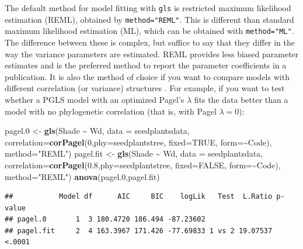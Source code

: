\documentclass[
]{book}
\newenvironment{Shaded}{\begin{snugshade}}{\end{snugshade}}
\newcommand{\AttributeTok}[1]{\textcolor[rgb]{0.13,0.29,0.53}{#1}}
\newcommand{\ConstantTok}[1]{\textcolor[rgb]{0.56,0.35,0.01}{#1}}
\newcommand{\DecValTok}[1]{\textcolor[rgb]{0.00,0.00,0.81}{#1}}
\newcommand{\FloatTok}[1]{\textcolor[rgb]{0.00,0.00,0.81}{#1}}
\newcommand{\FunctionTok}[1]{\textcolor[rgb]{0.13,0.29,0.53}{\textbf{#1}}}
\newcommand{\NormalTok}[1]{#1}
\newcommand{\OtherTok}[1]{\textcolor[rgb]{0.56,0.35,0.01}{#1}}
\newcommand{\SpecialCharTok}[1]{\textcolor[rgb]{0.81,0.36,0.00}{\textbf{#1}}}
\newcommand{\StringTok}[1]{\textcolor[rgb]{0.31,0.60,0.02}{#1}}
\begin{document}
The default method for model fitting with \texttt{gls} is restricted maximum likelihood estimation (REML), obtained by \texttt{method="REML"}. This is different than standard maximum likelihood estimation (ML), which can be obtained with \texttt{method="ML"}. The difference between these is complex, but suffice to say that they differ in the way the variance parameters are estimated. REML provides less biased parameter estimates and is the preferred method to report the parameter coefficients in a publication. It is also the method of choice if you want to compare models with different correlation (or variance) structures \citep{zuur2009mixed}. For example, if you want to test whether a PGLS model with an optimized Pagel's \(\lambda\) fits the data better than a model with no phylogenetic correlation (that is, with Pagel \(\lambda=0\)):

\begin{Shaded}
\begin{Highlighting}[]
\NormalTok{pagel}\FloatTok{.0} \OtherTok{\textless{}{-}} \FunctionTok{gls}\NormalTok{(Shade }\SpecialCharTok{\textasciitilde{}}\NormalTok{ Wd, }\AttributeTok{data =}\NormalTok{ seedplantsdata, }
               \AttributeTok{correlation=}\FunctionTok{corPagel}\NormalTok{(}\DecValTok{0}\NormalTok{,}\AttributeTok{phy=}\NormalTok{seedplantstree, }
                                    \AttributeTok{fixed=}\ConstantTok{TRUE}\NormalTok{, }\AttributeTok{form=}\SpecialCharTok{\textasciitilde{}}\NormalTok{Code), }
               \AttributeTok{method=}\StringTok{"REML"}\NormalTok{)}
\NormalTok{pagel.fit }\OtherTok{\textless{}{-}} \FunctionTok{gls}\NormalTok{(Shade }\SpecialCharTok{\textasciitilde{}}\NormalTok{ Wd, }\AttributeTok{data =}\NormalTok{ seedplantsdata, }
                 \AttributeTok{correlation=}\FunctionTok{corPagel}\NormalTok{(}\FloatTok{0.8}\NormalTok{,}\AttributeTok{phy=}\NormalTok{seedplantstree, }
                                      \AttributeTok{fixed=}\ConstantTok{FALSE}\NormalTok{, }\AttributeTok{form=}\SpecialCharTok{\textasciitilde{}}\NormalTok{Code),}
                 \AttributeTok{method=}\StringTok{"REML"}\NormalTok{)}
\FunctionTok{anova}\NormalTok{(pagel}\FloatTok{.0}\NormalTok{,pagel.fit)}
\end{Highlighting}
\end{Shaded}

\begin{verbatim}
##           Model df      AIC     BIC    logLik   Test  L.Ratio p-value
## pagel.0       1  3 180.4720 186.494 -87.23602                        
## pagel.fit     2  4 163.3967 171.426 -77.69833 1 vs 2 19.07537  <.0001
\end{verbatim}
\end{document}
